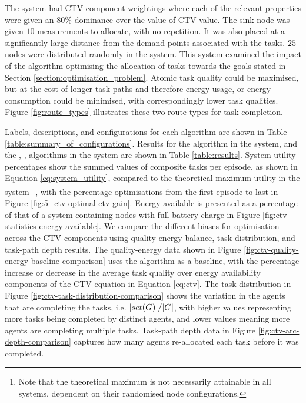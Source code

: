 
The \simulationExtended{}{} system had CTV component weightings where each of the relevant properties were given an $80\%$ dominance over the value of CTV value. The sink node was given $10$ measurements to allocate, with no repetition. It was also placed at a significantly large distance from the demand points associated with the tasks. $25$ nodes were distributed randomly in the system. This system examined the impact of the algorithm optimising the allocation of tasks towards the goals stated in Section \ref{section:optimisation_problem}. Atomic task quality could be maximised, but at the cost of longer task-paths and therefore energy usage, or energy consumption could be minimised, with correspondingly lower task qualities. Figure \ref{fig:route_types} illustrates these two route types for task completion.

Labels, descriptions, and configurations for each algorithm are shown in Table \ref{table:summary_of_configurations}. Results for the \algorithmBalanced{}{} algorithm in the \simulationSimple{}{} system, and the \algorithmEnergy{}{}, \algorithmQuality{}{}, \algorithmDistribution{}{} algorithms in the \simulationExtended{}{} system are shown in Table \ref{table:results}. System utility percentages show the summed values of composite tasks per episode, as shown in Equation \ref{eq:system_utility}, compared to the theoretical maximum utility in the system \footnote{Note that the theoretical maximum is not necessarily attainable in all systems, dependent on their randomised node configurations.}, with the percentage optimisations from the first episode to last in Figure \ref{fig:5_ctv-optimal-ctv-gain}. Energy available is presented as a percentage of that of a system containing nodes with full battery charge in Figure \ref{fig:ctv-statistics-energy-available}. We compare the different biases for optimisation across the CTV components using quality-energy balance, task distribution, and task-path depth results. The quality-energy data shown in Figure \ref{fig:ctv-quality-energy-baseline-comparison} uses the \algorithmEnergy{}{} algorithm as a baseline, with the percentage increase or decrease in the average task quality over energy availability components of the CTV equation in Equation \ref{eq:ctv}. The task-distribution in Figure \ref{fig:ctv-task-distribution-comparison} shows the variation in the agents that are completing the tasks, i.e. $\lvert set(G_{}^{}) \rvert{}/\lvert G_{}^{} \rvert{}$, with higher values representing more tasks being completed by distinct agents, and lower values meaning more agents are completing multiple tasks. Task-path depth data in Figure \ref{fig:ctv-arc-depth-comparison} captures how many agents re-allocated each task before it was completed.